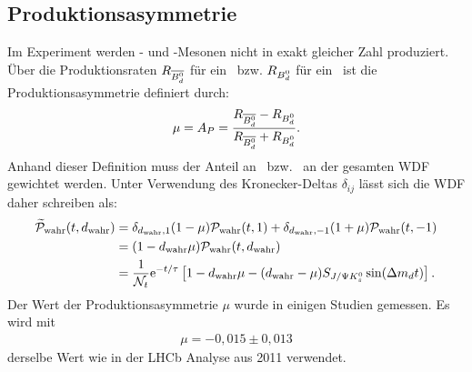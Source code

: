 \subsection{Produktionsasymmetrie}
Im Experiment werden \Bd- und \Bdbar-Mesonen nicht in exakt gleicher Zahl produziert. Über die Produktionsraten $R_{\text{$\overline{B_d^0}$}}$ für ein \Bdbar\ bzw. $R_{\text{$B_d^0$}}$ für ein \Bd\ ist die Produktionsasymmetrie definiert durch:
\begin{align}
\mu = A_P = \frac{R_{\text{$\overline{B_d^0}$}}-R_{\text{$B_d^0$}}}{R_{\text{$\overline{B_d^0}$}}+R_{\text{$B_d^0$}}}.
\end{align}
Anhand dieser Definition muss der Anteil an \Bd\ bzw. \Bdbar\ an der gesamten WDF gewichtet werden. Unter Verwendung des Kronecker-Deltas $\delta_{ij}$ lässt sich die WDF daher schreiben als:
\begin{align}
\nonumber \widetilde{\mathcal{P}}_{\text{wahr}}(t, d_{\text{wahr}}) &= \delta_{d_{\text{wahr}},1}(1-\mu)\mathcal{P}_{\text{wahr}}(t, 1) + \delta_{d_{\text{wahr}},-1}(1+\mu)\mathcal{P}_{\text{wahr}}(t, -1) \\
\nonumber &= (1-d_{\text{wahr}}\mu)\mathcal{P}_{\text{wahr}}(t, d_{\text{wahr}}) \\
&= \frac{1}{\mathcal{N}_t}\mathrm{e}^{-t/\tau}\left[1-d_{\text{wahr}}\mu - (d_{\text{wahr}}-\mu)S_{J/\Psi K_s^0}\sin(\Delta m_d t)\right].
\end{align}
Der Wert der Produktionsasymmetrie $\mu$ wurde in einigen Studien gemessen. Es wird mit 
\begin{align}
\mu = -0,015 \pm 0,013
\end{align}
derselbe Wert wie in der LHCb Analyse aus 2011 \cite{lhcb-paper} verwendet.

